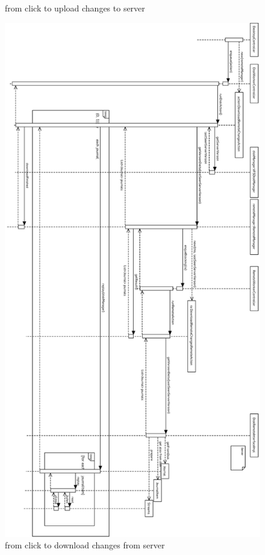 \begin{figure}[h!]
\caption{from click to upload changes to server}
\label{fig:22uploadChanges}
\end{figure}

\begin{figure}[h!]
\centering
\includegraphics[height=\textheight,width=\textwidth,keepaspectratio]{figures/22downloadChanges.eps}
\caption{from click to download changes from server}
\label{fig:22downloadChanges}
\end{figure}


